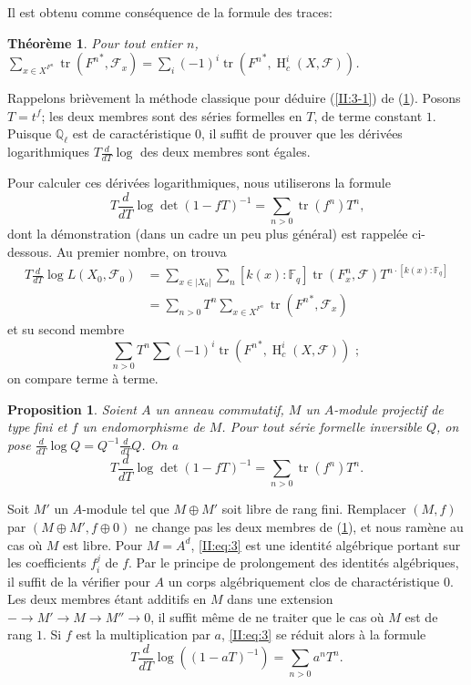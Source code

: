 \documentclass{book}
\DeclareMathOperator{\h}{H}
\DeclareMathOperator{\tr}{tr}
\newcommand{\cF}{\mathcal{F}}
\newcommand{\dF}{\mathbb{F}}
\newcommand{\dQ}{\mathbb{Q}}
\newtheorem{theorem_}[subsection]{Théorème}
\newtheorem{proposition_}[subsection]{Proposition}
\begin{document}
Il est obtenu comme conséquence de la formule des traces:





\begin{theorem_}\label{II:3-2}
Pour tout entier $n$, 
$\sum_{x\in X^{F^n}} \tr\left({F^n}^*,\cF_x\right) = \sum_i (-1)^i \tr\left({F^n}^*,\h_c^i(X,\cF)\right)$. 
\end{theorem_}





Rappelons brièvement la méthode classique pour déduire (\ref{II:3-1}) 
de (\ref{II:3-2}). Posons $T=t^f$; les deux membres sont des séries formelles 
en $T$, de terme constant $1$. Puisque $\dQ_\ell$ est de caractéristique 
$0$, il suffit de prouver que les dérivées logarithmiques 
$T\frac{d}{dT}\log$ des deux membres sont égales. 

Pour calculer ces dérivées logarithmiques, nous utiliserons la formule 
\[
  T \frac{d}{dT}\log\det(1-f T)^{-1} = \sum_{n>0} \tr(f^n) T^n \text{,}
\]
dont la démonstration (dans un cadre un peu plus général) est rappelée 
ci-dessous. Au premier nombre, on trouva 
\begin{align*}
  T\frac{d}{dT}\log L(X_0,\cF_0) 
    &= \sum_{x\in |X_0|} \sum_n [k(x):\dF_q] \tr\left(F_x^n,\cF\right) T^{n\cdot[k(x):\dF_q]} \\
    &= \sum_{n>0} T^n \sum_{x\in X^{F^n}} \tr\left({F^n}^*,\cF_x\right)
\end{align*}
et su second membre 
\[
  \sum_{n>0} T^n \sum (-1)^i \tr\left({F^n}^*,\h_c^i(X,\cF)\right) \text{ ; }
\]
on compare terme à terme. 





\begin{proposition_}\label{II:3-3}
Soient $A$ un anneau commutatif, $M$ un $A$-module projectif de type fini et 
$f$ un endomorphisme de $M$. Pour tout série formelle inversible $Q$, on pose 
$\frac{d}{dT}\log Q = Q^{-1}\frac{d}{dT}Q$. On a 
\begin{equation}\label{II:eq:3}
  T\frac{d}{dT}\log\det(1-f T)^{-1} = \sum_{n>0} \tr(f^n) T^n \text{.}
\end{equation}
\end{proposition_}

Soit $M'$ un $A$-module tel que $M\oplus M'$ soit libre de rang fini. 
Remplacer $(M,f)$ par $(M\oplus M',f\oplus 0)$ ne change pas les deux membres 
de (\ref{II:3-3}), et nous ramène au cas où $M$ est libre. Pour $M=A^d$, 
\eqref{II:eq:3} est une identité algébrique portant sur les coefficients 
$f_i^j$ de $f$. Par le principe de prolongement des identités algébriques, 
il suffit de la vérifier pour $A$ un corps algébriquement clos de 
charactéristique $0$. Les deux membres étant additifs en $M$ dans une 
extension $-\to M'\to M\to M''\to 0$, il suffit même de ne traiter que le cas 
où $M$ est de rang $1$. Si $f$ est la multiplication par $a$, \eqref{II:eq:3} 
se réduit alors à la formule 
\[
  T\frac{d}{dT}\log\left((1-a T)^{-1}\right) = \sum_{n>0} a^n T^n \text{.}
\]
\end{document}
